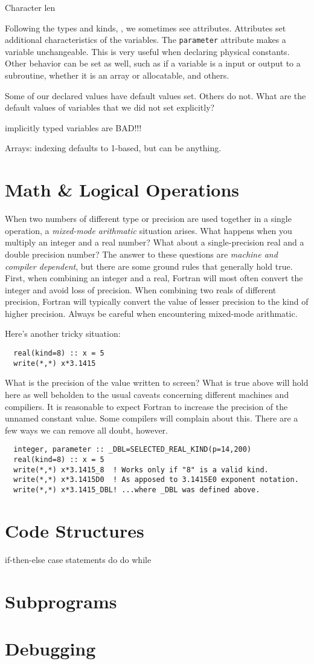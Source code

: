 \documentclass[11pt, letterpaper]{article}
\begin{document}
Character len

Following the types and kinds, , we sometimes see attributes.  Attributes set
additional characteristics of the variables.  The \texttt{parameter} attribute
makes a variable unchangeable.  This is very useful when declaring physical
constants.  Other behavior can be set as well, such as if a variable is a input
or output to a subroutine, whether it is an array or allocatable, and others.

Some of our declared values have default values set.  Others do not.  What
are the default values of variables that we did not set explicitly?

implicitly typed variables are BAD!!!

Arrays: indexing defaults to 1-based, but can be anything.

\section{Math \& Logical Operations}

When two numbers of different type or precision are used together in a single
operation, a \emph{mixed-mode arithmatic} situation arises.  What happens when
you multiply an integer and a real number?  What about a single-precision
real and a double precision number?  The answer to these questions are
\emph{machine and compiler dependent}, but there are some ground rules that
generally hold true.  First, when combining an integer and a real, Fortran
will most often convert the integer and avoid loss of precision.  When
combining two reals of different precision, Fortran will typically convert the
value of lesser precision to the kind of higher precision.  Always be
careful when encountering mixed-mode arithmatic.

Here's another tricky situation:
\begin{verbatim}
  real(kind=8) :: x = 5
  write(*,*) x*3.1415
\end{verbatim}
What is the precision of the value written to screen?  What is true above
will hold here as well beholden to the usual caveats concerning different
machines and compiliers.  It is reasonable to expect Fortran to increase the
precision of the unnamed constant value.  Some compilers will complain about
this.  There are a few ways we can remove all doubt, however.
\begin{verbatim}
  integer, parameter :: _DBL=SELECTED_REAL_KIND(p=14,200)
  real(kind=8) :: x = 5
  write(*,*) x*3.1415_8  ! Works only if "8" is a valid kind.
  write(*,*) x*3.1415D0  ! As apposed to 3.1415E0 exponent notation.
  write(*,*) x*3.1415_DBL! ...where _DBL was defined above.
\end{verbatim}

\section{Code Structures}

if-then-else
case statements
do
do while


\section{Subprograms}

\section{Debugging}
\end{document}
